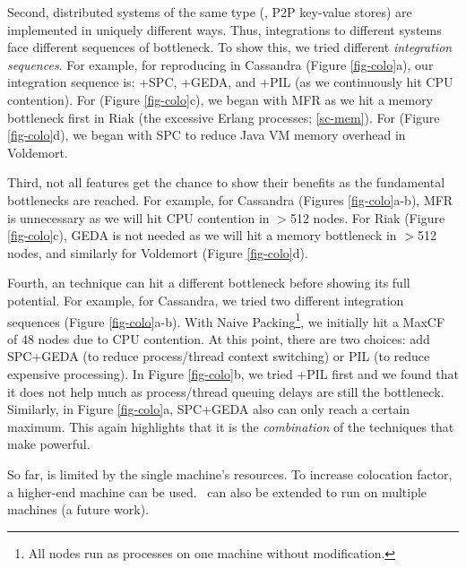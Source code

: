 Second, distributed systems of the same type (\eg, P2P key-value stores)
are implemented in uniquely different ways.  Thus, integrations to
different systems face different sequences of bottleneck.  To show this,
we tried different {\em integration sequences}.  For example, for
reproducing \caone in Cassandra (Figure \ref{fig-colo}a), our integration
sequence is: +SPC, +GEDA, and +PIL (as we continuously hit CPU
contention).
%
For \riakone (Figure \ref{fig-colo}c), we began with MFR
as we hit a memory bottleneck first in Riak (the excessive Erlang processes;
\sec\ref{sc-mem}).
%
For \voldone (Figure \ref{fig-colo}d), we began with SPC to reduce Java VM
memory overhead in Voldemort.


Third, not all features get the chance to show their benefits as the
fundamental bottlenecks are reached.  For example, for Cassandra \caone
(Figures \ref{fig-colo}a-b), MFR is unnecessary as we will hit CPU
contention in $>$512 nodes.  For Riak \riakone (Figure \ref{fig-colo}c),
GEDA is not needed as we will hit a memory bottleneck in $>$512 nodes, and
similarly for Voldemort \voldone (Figure \ref{fig-colo}d).

Fourth, an \sck technique can hit a different bottleneck before showing
its full potential.  For example, for Cassandra, we tried two different
integration sequences (Figure \ref{fig-colo}a-b).  With 
Naive Packing\footnote{All nodes run as processes on
one machine without modification.}, we
initially hit a MaxCF of 48 nodes due to CPU contention.  At this point,
there are two choices: add SPC+GEDA (to reduce process/thread context
switching) or PIL (to reduce expensive processing).  In Figure
\ref{fig-colo}b, we tried +PIL first and we found that it does not help
much as process/thread queuing delays are still the bottleneck.
Similarly, in Figure \ref{fig-colo}a, SPC+GEDA also can only reach a
certain maximum.  This again highlights that it is the {\em combination} 
of the
techniques that make \sck powerful.


So far, \sck is limited by the single machine's resources.  To increase
colocation factor, a higher-end machine can be used.  \sck\ can also be
extended to run on multiple machines (a future work).

